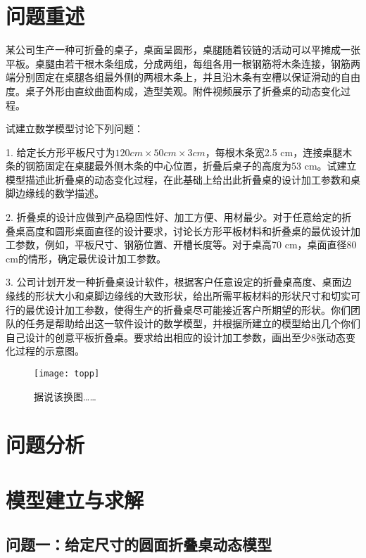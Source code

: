 \documentclass[12pt,a4paper]{article}
\begin{document}
\renewcommand{\contentsname}{目录}
\tableofcontents

\section{问题重述}
某公司生产一种可折叠的桌子，桌面呈圆形，桌腿随着铰链的活动可以平摊成一张平板。桌腿由若干根木条组成，分成两组，每组各用一根钢筋将木条连接，钢筋两端分别固定在桌腿各组最外侧的两根木条上，并且沿木条有空槽以保证滑动的自由度。桌子外形由直纹曲面构成，造型美观。附件视频展示了折叠桌的动态变化过程。\par
试建立数学模型讨论下列问题：\par
1. 给定长方形平板尺寸为$120 cm \times 50 cm \times 3 cm$，每根木条宽2.5 cm，连接桌腿木条的钢筋固定在桌腿最外侧木条的中心位置，折叠后桌子的高度为53 cm。试建立模型描述此折叠桌的动态变化过程，在此基础上给出此折叠桌的设计加工参数和桌脚边缘线的数学描述。\par
2. 折叠桌的设计应做到产品稳固性好、加工方便、用材最少。对于任意给定的折叠桌高度和圆形桌面直径的设计要求，讨论长方形平板材料和折叠桌的最优设计加工参数，例如，平板尺寸、钢筋位置、开槽长度等。对于桌高70 cm，桌面直径80 cm的情形，确定最优设计加工参数。\par
3. 公司计划开发一种折叠桌设计软件，根据客户任意设定的折叠桌高度、桌面边缘线的形状大小和桌脚边缘线的大致形状，给出所需平板材料的形状尺寸和切实可行的最优设计加工参数，使得生产的折叠桌尽可能接近客户所期望的形状。你们团队的任务是帮助给出这一软件设计的数学模型，并根据所建立的模型给出几个你们自己设计的创意平板折叠桌。要求给出相应的设计加工参数，画出至少8张动态变化过程的示意图。\par
\cite{qiyuan03}
\cite{guangzhou12}
\cite{guangzhou09}

\renewcommand{\figurename}{图}
\begin{figure}
\centering
\texttt{[image: topp]}
\caption{据说该换图……}
\label{fig:my_label}
\end{figure}

\section{问题分析}
\section{模型建立与求解}
\subsection{问题一：给定尺寸的圆面折叠桌动态模型}
\end{document}
